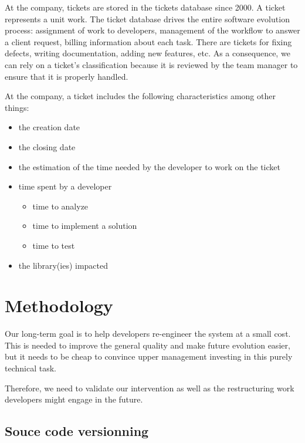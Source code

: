 \documentclass[10pt,conference]{IEEEtran}
\begin{document}
At the company, tickets are stored in the tickets database since 2000.
A ticket represents a unit work.
The ticket database drives the entire software evolution process: assignment of work to developers, management of the workflow to answer a client request, billing information about each task.
There are tickets for fixing defects, writing documentation, adding new features, etc. 
As a consequence, we can rely on a ticket's classification because it is reviewed by the team manager to ensure that it is properly handled.

At the company, a ticket includes the following characteristics among other things:

\begin{itemize}
\item the creation date
\item the closing date
\item the estimation of the time needed by the developer to work on the ticket
\item time spent by a developer
  \begin{itemize}
  \item time to analyze
  \item time to implement a solution
  \item time to test
  \end{itemize}
  \item the library(ies) impacted
\end{itemize}

\section{Methodology}
\label{sec:methodology}


Our long-term goal is to help developers re-engineer the system at a small cost.
This is needed to improve the general quality and make future evolution easier, but it needs to be cheap to convince upper management investing in this purely technical task.

Therefore, we need to validate our intervention as well as the restructuring work developers might engage in the future.

\subsection{Souce code versionning}
\end{document}
